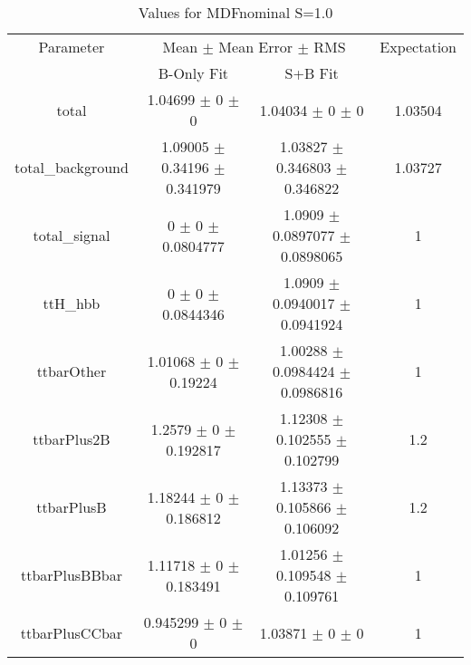 \begin{table}
\centering
\caption{Values for MDFnominal S=1.0}
\begin{tabular}{cccc}
\toprule
Parameter & \multicolumn{2}{c}{Mean $\pm$ Mean Error $\pm$ RMS} & Expectation\\
 & B-Only Fit & S+B Fit & \\
\midrule
total & \num{1.04699} $\pm$ \num{0} $\pm$ \num{0} & \num{1.04034} $\pm$ \num{0} $\pm$ \num{0} & \num{1.03504}\\
total\_background & \num{1.09005} $\pm$ \num{0.34196} $\pm$ \num{0.341979} & \num{1.03827} $\pm$ \num{0.346803} $\pm$ \num{0.346822} & \num{1.03727}\\
total\_signal & \num{0} $\pm$ \num{0} $\pm$ \num{0.0804777} & \num{1.0909} $\pm$ \num{0.0897077} $\pm$ \num{0.0898065} & \num{1}\\
ttH\_hbb & \num{0} $\pm$ \num{0} $\pm$ \num{0.0844346} & \num{1.0909} $\pm$ \num{0.0940017} $\pm$ \num{0.0941924} & \num{1}\\
ttbarOther & \num{1.01068} $\pm$ \num{0} $\pm$ \num{0.19224} & \num{1.00288} $\pm$ \num{0.0984424} $\pm$ \num{0.0986816} & \num{1}\\
ttbarPlus2B & \num{1.2579} $\pm$ \num{0} $\pm$ \num{0.192817} & \num{1.12308} $\pm$ \num{0.102555} $\pm$ \num{0.102799} & \num{1.2}\\
ttbarPlusB & \num{1.18244} $\pm$ \num{0} $\pm$ \num{0.186812} & \num{1.13373} $\pm$ \num{0.105866} $\pm$ \num{0.106092} & \num{1.2}\\
ttbarPlusBBbar & \num{1.11718} $\pm$ \num{0} $\pm$ \num{0.183491} & \num{1.01256} $\pm$ \num{0.109548} $\pm$ \num{0.109761} & \num{1}\\
ttbarPlusCCbar & \num{0.945299} $\pm$ \num{0} $\pm$ \num{0} & \num{1.03871} $\pm$ \num{0} $\pm$ \num{0} & \num{1}\\
\bottomrule
\end{tabular}
\end{table}